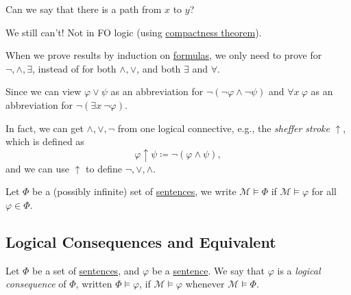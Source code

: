 \begin{problem*}
	Can we say that there is a path from \(x\) to \(y\)?
\end{problem*}
\begin{answer}
	We still can't! Not in FO logic (using \hyperref[thm:compactness]{compactness theorem}).
\end{answer}

\begin{remark}
	When we prove results by induction on \hyperref[def:formula]{formulas}, we only need to prove for \(\lnot , \land , \exists \), instead of for both \(\land , \lor \), and both \(\exists \) and \(\forall \).
\end{remark}
\begin{explanation}
	Since we can view \(\varphi \lor \psi \) as an abbreviation for \(\lnot (\lnot \varphi \land \lnot \psi ) \) and \(\forall x\ \varphi \) as an abbreviation for \(\lnot (\exists x\ \lnot \varphi )\).
\end{explanation}

\begin{remark}
	In fact, we can get \(\land , \lor , \lnot\) from one logical connective, e.g., the \emph{sheffer stroke} \(\uparrow \), which is defined as
	\[
		\varphi \uparrow \psi \coloneqq \lnot(\varphi \land \psi ),
	\]
	and we can use \(\uparrow \) to define \(\lnot, \lor , \land \).
\end{remark}

\begin{notation}
	Let \(\Phi \) be a (possibly infinite) set of \hyperref[def:sentence]{sentences}, we write \(\mathcal{M} \models \Phi \) if \(\mathcal{M} \models \varphi \) for all \(\varphi \in \Phi \).
\end{notation}

\subsection{Logical Consequences and Equivalent}
\begin{definition}\label{def:logical-consequence}
	Let \(\Phi \) be a set of \hyperref[def:sentence]{sentences}, and \(\varphi \) be a \hyperref[def:sentence]{sentence}. We say that \(\varphi \) is a \emph{logical consequence} of \(\Phi \), written \(\Phi \models \varphi \), if \(\mathcal{M} \models \varphi \) whenever \(\mathcal{M} \models \Phi \).
\end{definition}

